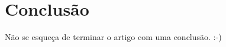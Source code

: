\documentclass[twoside,english,brazilian]{UNISINOSartigo}
\begin{document}
\section{Conclusão}
Não se esqueça de terminar o artigo com uma conclusão. :-)

%





\end{document}
